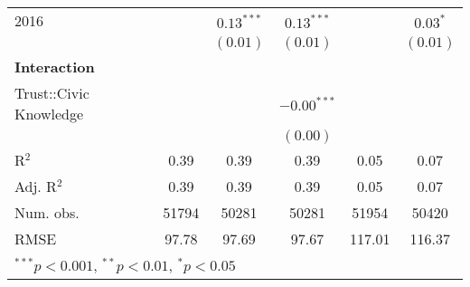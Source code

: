 \documentclass{article}
\begin{document}
\begin{landscape}
\begin{table}
\begin{center}
\begin{tabular}{l c c c c c }
2016                       &               & $0.13^{***}$    & $0.13^{***}$    &               & $0.03^{*}$    \\
                            &               & $(0.01)$        & $(0.01)$        &               & $(0.01)$      \\
\textbf{Interaction} &  &    &    &       &               \\
Trust::Civic Knowledge &               &                 & $-0.00^{***}$   &               &               \\
                            &               &                 & $(0.00)$        &               &               \\
\hline
R$^2$                       & 0.39          & 0.39            & 0.39            & 0.05          & 0.07          \\
Adj. R$^2$                  & 0.39          & 0.39            & 0.39            & 0.05          & 0.07          \\
Num. obs.                   & 51794         & 50281           & 50281           & 51954         & 50420         \\
RMSE                        & 97.78         & 97.69           & 97.67           & 117.01        & 116.37        \\
\hline
\multicolumn{6}{l}{\scriptsize{$^{***}p<0.001$, $^{**}p<0.01$, $^*p<0.05$}}
\end{tabular}
\label{table:coefficients}
\end{center}
\end{table}
\end{landscape}
\end{document}
